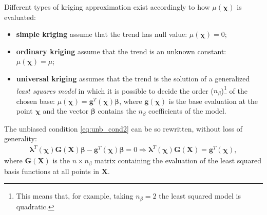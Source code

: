 Different types of kriging approximation exist accordingly to how $\mu(\boldsymbol{\chi})$ is evaluated:
\begin{itemize}
	\item \textbf{simple kriging} assume that the trend has null value: $\mu(\boldsymbol{\chi}) = 0$;
	\item \textbf{ordinary kriging} assume that the trend is an unknown constant: $\mu(\boldsymbol{\chi}) = \mu$;
	\item \textbf{universal kriging} assumes that the trend is the solution of a generalized \textit{least squares model} in which it is possible to decide the order ($n_{\beta}$)\footnote{This means that, for example, taking $n_{\beta}= 2$ the least squared model is quadratic.} of the chosen base: $\mu(\boldsymbol{\chi}) = \mathbf{g}^T(\boldsymbol{\chi}) \boldsymbol{\beta}$, where $\mathbf{g}(\boldsymbol{\chi})$ is the base evaluation at the point $\boldsymbol{\chi}$ and the vector $\boldsymbol{\beta}$ contains the $n_{\beta}$ coefficients of the model.
\end{itemize}

The unbiased condition \eqref{eq:unb_cond2} can be so rewritten, without loss of generality:
\begin{eqnarray}
 \boldsymbol{ \lambda}^T (\boldsymbol{\chi}) \mathbf{G}(\mathbf{X}) \boldsymbol{\beta} - \mathbf{g}^T(\boldsymbol{\chi}) \boldsymbol{\beta} = 0 \Longrightarrow \boldsymbol{\lambda}^T(\boldsymbol{\chi}) \mathbf{G}(\mathbf{X}) = \mathbf{g}^T(\boldsymbol{\chi}),
\end{eqnarray}
where $\mathbf{G}(\mathbf{X})$ is the $n \times n_{\beta}$ matrix containing the evaluation of the least squared basis functions at all points in $\mathbf{X}$.

